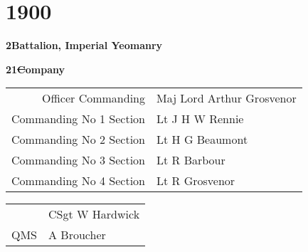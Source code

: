 \chapter*{1900}

\vspace*{10mm}

\begin{center}
  \Large
  \textbf{2\nd Battalion, Imperial Yeomanry}
\end{center}

\vspace*{10mm}

\begin{center}
  \Large
  \textbf{21\st Company}
\end{center}

\vspace*{3mm}

\begin{center}
  \begin{tabular}{rl}
    Officer Commanding & Maj Lord Arthur Grosvenor \\
    Commanding No 1 Section & Lt J H W Rennie \\
    Commanding No 2 Section & Lt H G Beaumont \\
    Commanding No 3 Section & Lt R Barbour \\
    Commanding No 4 Section & Lt R Grosvenor \\
  \end{tabular}
\end{center}

\vspace*{3mm}

\begin{center}
  \begin{tabular}{rl}
    & CSgt W Hardwick \\
    QMS & A Broucher \\
  \end{tabular}
\end{center}

\vspace*{3mm}

